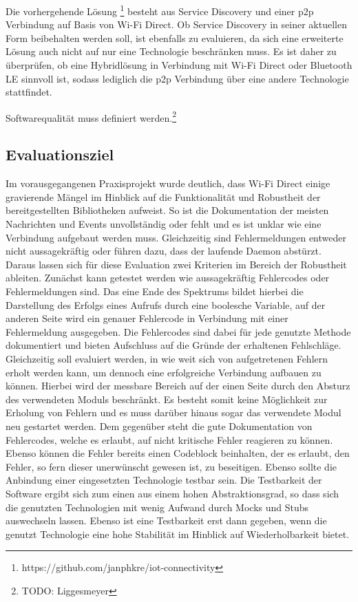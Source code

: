 \documentclass[12pt,a4paper]{article}
\begin{document}
        Die vorhergehende Lösung \footnote{https://github.com/janphkre/iot-connectivity} besteht aus Service Discovery und einer p2p Verbindung auf Basis von Wi-Fi Direct. Ob Service Discovery in seiner aktuellen Form beibehalten werden soll, ist ebenfalls zu evaluieren, da sich eine erweiterte Lösung auch nicht auf nur eine Technologie beschränken muss. Es ist daher zu überprüfen, ob eine Hybridlösung in Verbindung mit Wi-Fi Direct oder Bluetooth LE sinnvoll ist, sodass lediglich die p2p Verbindung über eine andere Technologie stattfindet.

		Softwarequalität muss definiert werden.\footnote{TODO: Liggesmeyer}
        \subsection{Evaluationsziel}	
        Im vorausgegangenen Praxisprojekt wurde deutlich, dass Wi-Fi Direct einige gravierende Mängel im Hinblick auf die Funktionalität und Robustheit der bereitgestellten Bibliotheken aufweist. So ist die Dokumentation der meisten Nachrichten und Events unvollständig oder fehlt und es ist unklar wie eine Verbindung aufgebaut werden muss. Gleichzeitig sind Fehlermeldungen entweder nicht aussagekräftig oder führen dazu, dass der laufende Daemon abstürzt.
        Daraus lassen sich für diese Evaluation zwei Kriterien im Bereich der Robustheit ableiten.
        Zunächst kann getestet werden wie aussagekräftig Fehlercodes oder Fehlermeldungen sind.
        Das eine Ende des Spektrums bildet hierbei die Darstellung des Erfolgs eines Aufrufs durch eine boolesche Variable, auf der anderen Seite wird ein genauer Fehlercode in Verbindung mit einer Fehlermeldung ausgegeben. Die Fehlercodes sind dabei für jede genutzte Methode dokumentiert und bieten Aufschluss auf die Gründe der erhaltenen Fehlschläge. 
        Gleichzeitig soll evaluiert werden, in wie weit sich von aufgetretenen Fehlern erholt werden kann, um dennoch eine erfolgreiche Verbindung aufbauen zu können. Hierbei wird der messbare Bereich auf der einen Seite durch den Absturz des verwendeten Moduls beschränkt. Es besteht somit keine Möglichkeit zur Erholung von Fehlern und es muss darüber hinaus sogar das verwendete Modul neu gestartet werden. Dem gegenüber steht die gute Dokumentation von Fehlercodes, welche es erlaubt, auf nicht kritische Fehler reagieren zu können. Ebenso können die Fehler bereits einen Codeblock beinhalten, der es erlaubt, den Fehler, so fern dieser unerwünscht gewesen ist, zu beseitigen.
        Ebenso sollte die Anbindung einer eingesetzten Technologie testbar sein. Die Testbarkeit der Software ergibt sich zum einen aus einem hohen Abstraktionsgrad, so dass sich die genutzten Technologien mit wenig Aufwand durch Mocks und Stubs auswechseln lassen. Ebenso ist eine Testbarkeit erst dann gegeben, wenn die genutzt Technologie eine hohe Stabilität im Hinblick auf Wiederholbarkeit bietet.
        
\end{document}
